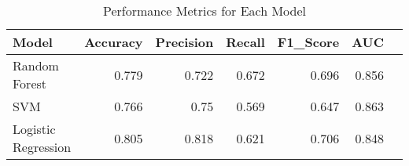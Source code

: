 \begin{table}
\caption{Performance Metrics for Each Model}
\label{tab:performance_metrics}
\begin{tabular}{lrrrrrr}
\toprule
Model & Accuracy & Precision & Recall & F1\_Score & AUC \\
\midrule
Random Forest & 0.779 & 0.722 & 0.672 & 0.696 & 0.856 \\
SVM & 0.766 & 0.75 & 0.569 & 0.647 & 0.863 \\
Logistic Regression & 0.805 & 0.818 & 0.621 & 0.706 & 0.848 \\
\bottomrule
\end{tabular}
\end{table}
